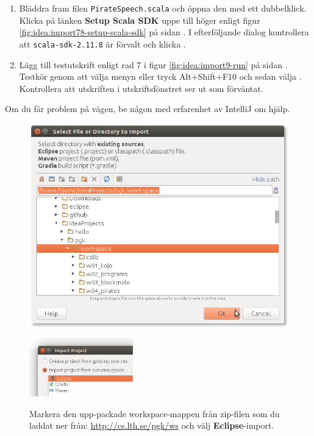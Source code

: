 \begin{enumerate}
\item Bläddra fram filen \texttt{PirateSpeech.scala} och öppna den med ett dubbelklick. Klicka på länken \textbf{Setup Scala SDK} uppe till höger enligt figur \ref{fig:idea:import78-setup-scala-sdk} på sidan \pageref{fig:idea:import78-setup-scala-sdk}. I efterföljande dialog kontrollera att \texttt{scala-sdk-2.11.8} är förvalt och klicka .

\item Lägg till testutskrift enligt rad 7 i figur \ref{fig:idea:import9-run} på sidan \pageref{fig:idea:import9-run}. Testkör genom att välja menyn  eller tryck Alt+Shift+F10 och sedan välja . Kontrollera att utskriften i utskriftsfönstret ser ut som förväntat.
\end{enumerate}

\noindent Om du får problem på vägen, be någon med erfarenhet av IntelliJ om hjälp.


{\vfill
\begin{figure}[H]
\centering
\includegraphics[width=1.0\textwidth]{../img/intellij/idea-import2-select.png}

{\hfill\includegraphics[width=0.4\textwidth]{../img/intellij/idea-import3-eclipse.png}}

\caption{Markera den upp-packade workspace-mappen från zip-filen som du laddat ner från: \url{http://cs.lth.se/pgk/ws} och välj \textbf{Eclipse}-import.}
\label{fig:idea:import23-select}
\end{figure}
}

